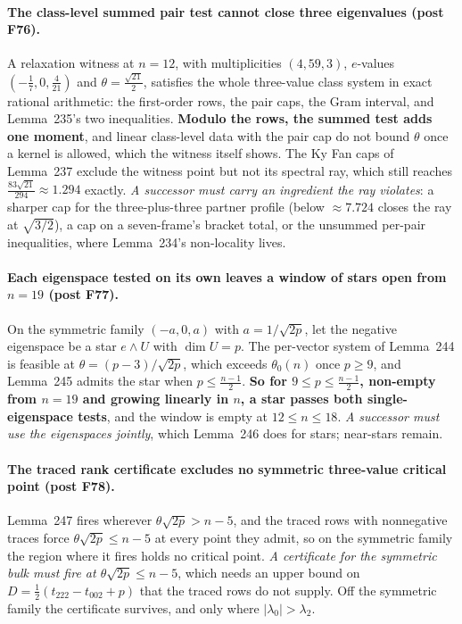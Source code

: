 \paragraph{The class-level summed pair test cannot close three eigenvalues (post F76).} A relaxation witness at $n=12$, with multiplicities $(4,59,3)$, $e$-values $(-\tfrac17,0,\tfrac4{21})$ and $\theta=\tfrac{\sqrt{21}}2$, satisfies the whole three-value class system in exact rational arithmetic: the first-order rows, the pair caps, the Gram interval, and Lemma~235's two inequalities. \textbf{Modulo the rows, the summed test adds one moment}, and linear class-level data with the pair cap do not bound $\theta$ once a kernel is allowed, which the witness itself shows. The Ky Fan caps of Lemma~237 exclude the witness point but not its spectral ray, which still reaches $\tfrac{83\sqrt{21}}{294}\approx1.294$ exactly. \emph{A successor must carry an ingredient the ray violates}: a sharper cap for the three-plus-three partner profile (below $\approx7.724$ closes the ray at $\sqrt{3/2}$), a cap on a seven-frame's bracket total, or the unsummed per-pair inequalities, where Lemma~234's non-locality lives.

\paragraph{Each eigenspace tested on its own leaves a window of stars open from $n=19$ (post F77).} On the symmetric family $(-a,0,a)$ with $a=1/\sqrt{2p}$, let the negative eigenspace be a star $e\wedge U$ with $\dim U=p$. The per-vector system of Lemma~244 is feasible at $\theta=(p-3)/\sqrt{2p}$, which exceeds $\theta_0(n)$ once $p\ge9$, and Lemma~245 admits the star when $p\le\tfrac{n-1}2$. \textbf{So for $9\le p\le\tfrac{n-1}2$, non-empty from $n=19$ and growing linearly in $n$, a star passes both single-eigenspace tests}, and the window is empty at $12\le n\le18$. \emph{A successor must use the eigenspaces jointly}, which Lemma~246 does for stars; near-stars remain.

\paragraph{The traced rank certificate excludes no symmetric three-value critical point (post F78).} Lemma~247 fires wherever $\theta\sqrt{2p}>n-5$, and the traced rows with nonnegative traces force $\theta\sqrt{2p}\le n-5$ at every point they admit, so on the symmetric family the region where it fires holds no critical point. \emph{A certificate for the symmetric bulk must fire at $\theta\sqrt{2p}\le n-5$}, which needs an upper bound on $D=\tfrac12(t_{222}-t_{002}+p)$ that the traced rows do not supply. Off the symmetric family the certificate survives, and only where $\lvert\lambda_0\rvert>\lambda_2$.

